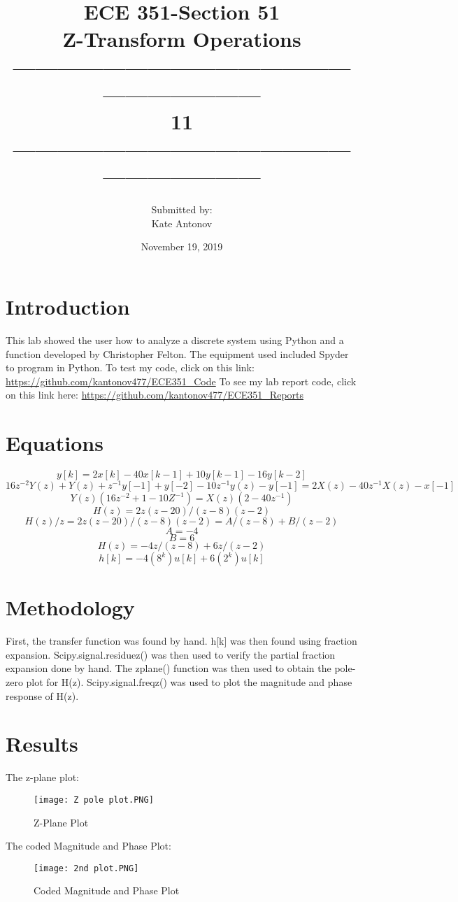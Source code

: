 \documentclass[12pt]{article}
\title{ECE 351-Section 51 \\ Z-Transform Operations
 \\ ------------------------------------------------------------------\\ 11 \\------------------------------------------------------------------}
\author{Submitted by: \\  Kate Antonov}
\date{November 19, 2019}
\begin{document}
\vspace{\fill}

\maketitle

\vspace{\fill}
\thispagestyle{empty}
\clearpage

\clearpage
\thispagestyle{empty}
\tableofcontents
\clearpage

\section{Introduction}
This lab showed the user how to 
analyze a discrete system using Python and a function developed by Christopher Felton.
\newline
The equipment used included Spyder to program in Python. To test my code, click on this link: 
\url{https://github.com/kantonov477/ECE351_Code}
\newline
To see my lab report code, click on this link here: 
\url{https://github.com/kantonov477/ECE351_Reports}
\section{Equations}
\[y[k] = 2x[k] − 40x[k − 1] + 10y[k − 1] − 16y[k − 2]\]
\[16z^{-2}Y(z) + Y(z) + z^{-1}y[-1]+y[-2] - 10z^{-1}y(z) - y[-1] = 2X(z) - 40z^{-1}X(z) - x[-1]\]
\[Y(z)(16z^{-2} + 1 - 10Z^{-1}) = X(z)(2 - 40z^{-1})\]
\[H(z) = 2z(z - 20)/(z-8)(z-2)\]
\[H(z)/z = 2z(z - 20)/(z-8)(z-2) = A/(z-8) + B/(z-2)\]
\[A = -4\]
\[B = 6\]
\[H(z) = -4z/(z-8) + 6z/(z-2)\]
\[h[k] = -4(8^k)u[k] + 6(2^k)u[k]\]

\section{Methodology}
First, the transfer function was found by hand. h[k] was then found using fraction expansion. \newline
Scipy.signal.residuez() was then used to verify the partial fraction expansion done by hand.
The zplane() function was then used to obtain the pole-zero plot for H(z). Scipy.signal.freqz() was used to plot the magnitude and phase response of H(z).
\section{Results}
The z-plane plot:
\begin{figure}[H]
\texttt{[image: Z pole plot.PNG]}
  \caption{Z-Plane Plot}
  \end{figure}
The coded Magnitude and Phase Plot:
\begin{figure}[H]
\texttt{[image: 2nd plot.PNG]}
  \caption{Coded Magnitude and Phase Plot}
  \end{figure}  
\end{document}
